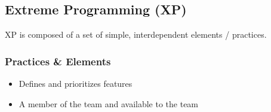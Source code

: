 \documentclass[
    ../../Software_Engineering_Summary.tex,
]
{subfiles}
\begin{document}
\newpage
\subsection{Extreme Programming (XP)}
XP is composed of a set of simple, interdependent elements / practices.

\subsubsection{Practices \& Elements}
\begin{defbox}
    \begin{itemize}
        \item Defines and prioritizes features
        \item A member of the team and available to the team
    \end{itemize}
\end{defbox}
\end{document}
